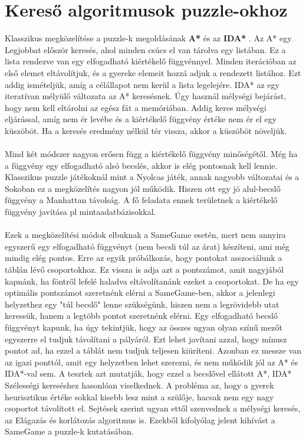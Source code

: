 \documentclass{article}
\begin{document}
	\section{Kereső algoritmusok puzzle-okhoz}	
	
	Klasszikus megközelítése a puzzle-k megoldásának \textbf{A*} \cite{hart1968formal} és az \textbf{IDA*} \cite{korf1985depth}. Az A* egy Legjobbat először keresés, ahol minden csúcs el van tárolva egy listában. Ez a lista rendezve van egy elfogadható kiértékelő függvénnyel. Minden iterációban az első elemet eltávolítjuk, és a gyereke elemeit hozzá adjuk a rendezett listához. Ezt addig ismételjük, amíg a célállapot nem kerül a lista legelejére. IDA* az egy iteratívan mélyülő változata az A* keresésnek. Úgy használ mélységi bejárást, hogy nem kell eltárolni az egész fát a memóriában. Addig keres mélységi eljárással, amíg nem ér levébe és a kiértékelő függvény értéke nem ér el egy küszöböt. Ha a keresés eredmény nélkül tér vissza, akkor a küszöböt növeljük.
	\\
	\\
	Mind két módszer nagyon erősen függ a kiértékelő függvény minőségétől. Még ha a függvény egy elfogadható alsó becslés, akkor is elég pontosnak kell lennie. Klasszikus puzzle játékoknál mint a Nyolcas játék, annak nagyobb változatai \cite{korf1985depth}  és a Sokoban \cite{junghanns2000pushing} ez a megközelítés nagyon jól működik. Hiszen ott egy jó alul-becslő függvény a Manhattan távolság. A fő feladata ennek területnek a kiértékelő függvény javítása pl mintaadatbázisokkal. \cite{felner2005dual} \cite{culberson1998pattern}
	\\
	\\
	Ezek a megközelítési módok elbuknak a SameGame esetén, mert nem annyira egyszerű egy elfogadható függvényt (nem becsli túl az árat) készíteni, ami még mindig elég pontos. Erre az egyik próbálkozás, hogy pontokat asszociálunk a táblán lévő csoportokhoz. Ez vissza is adja azt a pontszámot, amit nagyjából kapnánk, ha föntről lefelé haladva eltávolítanánk ezeket a csoportokat. De ha egy optimális pontszámot szeretnénk elérni a SameGame-ben, akkor a jelenlegi helyzethez egy "túl becslő" lenne szükségünk, hiszen nem a legrövidebb utat keressük, hanem a legtöbb pontot szeretnénk elérni. Egy elfogadható becslő függvényt kapunk, ha úgy tekintjük, hogy az összes ugyan olyan színű mezőt egyszerre el tudjuk távolítani a pályáról. Ezt lehet javítani azzal, hogy mínusz pontot ad, ha ezzel a táblát nem tudjuk teljesen kiüríteni. Azonban ez messze van az igazi ponttól, amit egy helyzetben lehet szerezni, és nem működik jól az A* és IDA*-val sem. A tesztek azt mutatják, hogy ezzel a becslővel ellátott A*, IDA* Szélességi kereséshez hasonlóan viselkednek.\cite{SCHADD20123} A probléma az, hogy a gyerek heurisztikus értéke sokkal kisebb lesz mint a szülője, hacsak nem egy nagy csoportot távolított el. Sejtések szerint ugyan ettől szenvednek a mélységi keresés, az Elágazás és korlátozás algoritmus is. \cite{vempaty1991depth} Ezekből kifolyólag jelent kihívást a SameGame a puzzle-k kutatásában.
	
\end{document}
